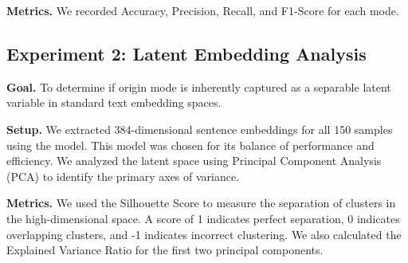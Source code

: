 {\bf Metrics.} We recorded Accuracy, Precision, Recall, and F1-Score for each mode.

\subsection{Experiment 2: Latent Embedding Analysis}
\label{subsec:exp2}

{\bf Goal.} To determine if origin mode is inherently captured as a separable latent variable in standard text embedding spaces.

{\bf Setup.} We extracted 384-dimensional sentence embeddings for all 150 samples using the \minilm model.
This model was chosen for its balance of performance and efficiency.
We analyzed the latent space using Principal Component Analysis (PCA) to identify the primary axes of variance.

{\bf Metrics.} We used the Silhouette Score to measure the separation of clusters in the high-dimensional space.
A score of 1 indicates perfect separation, 0 indicates overlapping clusters, and -1 indicates incorrect clustering.
We also calculated the Explained Variance Ratio for the first two principal components.
